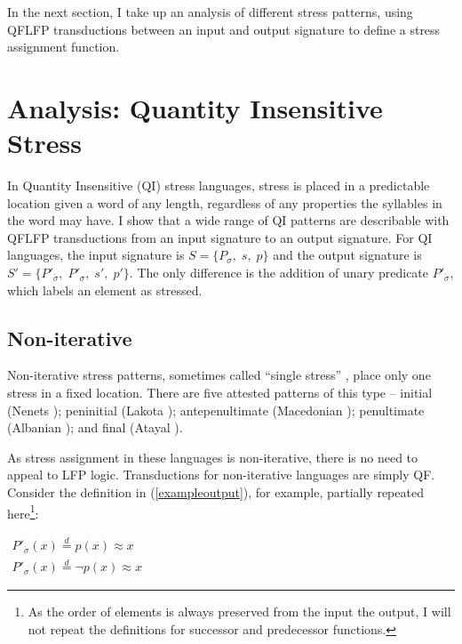 \documentclass[12pt]{article}
\newcommand{\sig}{\sigma}
\newcommand{\deq}{\stackrel{d}{=}}
\newcommand{\ass}{\acute{\sig}}
\begin{document}
In the next section, I take up an analysis of different stress patterns, using QFLFP transductions between an input and output signature to define a stress assignment function.

\section{Analysis: Quantity Insensitive Stress}

In Quantity Insensitive (QI) stress languages, stress is placed in a predictable location given a word of any length, regardless of any properties the syllables in the word may have. I show that a wide range of QI patterns are describable with QFLFP transductions from an input signature to an output signature. For QI languages, the input signature is $S = \lbrace P_\sig, \; s, \; p \rbrace $ and the output signature is $S' = \lbrace P'_\ass, \; P'_\sig, \; s', \; p' \rbrace$. The only difference is the addition of unary predicate $P'_\ass$, which labels an element as stressed.

\subsection{Non-iterative}

Non-iterative stress patterns, sometimes called ``single stress'' \citep{gordon2002}, place only one stress in a fixed location. There are five attested patterns of this type -- initial (Nenets \citep{decsy66}); peninitial (Lakota \citep{boas41}); antepenultimate (Macedonian \citep{horace52}); penultimate (Albanian \citep{hetzer78}); and final (Atayal \citep{egerod66}). 

As stress assignment in these languages is non-iterative, there is no need to appeal to LFP logic. Transductions for non-iterative languages are simply QF. Consider the definition in (\ref{exampleoutput}), for example, partially repeated here\footnote{As the order of elements is always preserved from the input the output, I will not repeat the definitions for successor and predecessor functions.}:

\begin{exe}
\item $\begin{array}{l}
   P'_\ass(x) \deq  p(x) \approx x  \\
   P'_\sig(x) \deq  \neg p(x) \approx x  
     
\end{array} $
\label{singledef}
\end{exe}
\end{document}
